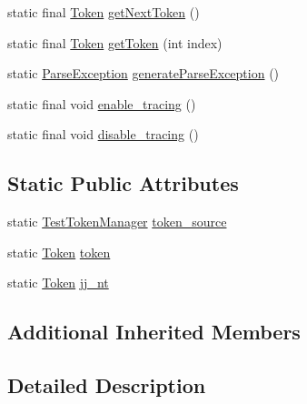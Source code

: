 \begin{DoxyCompactItemize}
static final \mbox{\hyperlink{classorg_1_1tec_1_1comp_1_1interpreter_1_1_token}{Token}} \mbox{\hyperlink{classorg_1_1tec_1_1comp_1_1interpreter_1_1_lang_parser_a9787cc54fd3cd768211efc9c61a279de}{get\+Next\+Token}} ()
\item 
static final \mbox{\hyperlink{classorg_1_1tec_1_1comp_1_1interpreter_1_1_token}{Token}} \mbox{\hyperlink{classorg_1_1tec_1_1comp_1_1interpreter_1_1_lang_parser_a9933b5189ec4eff3b75fd415723829f1}{get\+Token}} (int index)
\item 
static \mbox{\hyperlink{classorg_1_1tec_1_1comp_1_1interpreter_1_1_parse_exception}{Parse\+Exception}} \mbox{\hyperlink{classorg_1_1tec_1_1comp_1_1interpreter_1_1_lang_parser_aa2562d7831c14b9a077439ae4074236f}{generate\+Parse\+Exception}} ()
\item 
static final void \mbox{\hyperlink{classorg_1_1tec_1_1comp_1_1interpreter_1_1_lang_parser_ade719be0c0ee4d50e22bb29debe99d2f}{enable\+\_\+tracing}} ()
\item 
static final void \mbox{\hyperlink{classorg_1_1tec_1_1comp_1_1interpreter_1_1_lang_parser_ac0d33680d5aa43a2825bfc65acd20c37}{disable\+\_\+tracing}} ()
\end{DoxyCompactItemize}
\subsection*{Static Public Attributes}
\begin{DoxyCompactItemize}
\item 
static \mbox{\hyperlink{classorg_1_1tec_1_1comp_1_1interpreter_1_1_test_token_manager}{Test\+Token\+Manager}} \mbox{\hyperlink{classorg_1_1tec_1_1comp_1_1interpreter_1_1_lang_parser_a5b135742fa26954be3b9de68eaccaf68}{token\+\_\+source}}
\item 
static \mbox{\hyperlink{classorg_1_1tec_1_1comp_1_1interpreter_1_1_token}{Token}} \mbox{\hyperlink{classorg_1_1tec_1_1comp_1_1interpreter_1_1_lang_parser_a3b137d2c81757602c7d71a1a7ecc3691}{token}}
\item 
static \mbox{\hyperlink{classorg_1_1tec_1_1comp_1_1interpreter_1_1_token}{Token}} \mbox{\hyperlink{classorg_1_1tec_1_1comp_1_1interpreter_1_1_lang_parser_ab198f97b60f908b9ac70165c8e10deac}{jj\+\_\+nt}}
\end{DoxyCompactItemize}
\subsection*{Additional Inherited Members}


\subsection{Detailed Description}


